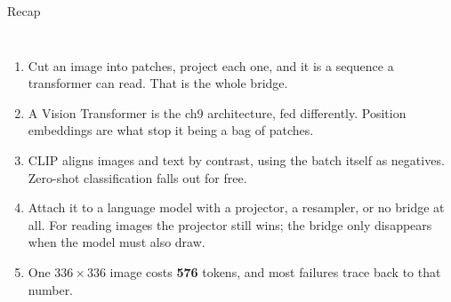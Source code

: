 \documentclass[aspectratio=169]{beamer}
\begin{document}
\begin{frame}{Recap}
  \small
  \begin{columns}[T]
    \begin{enumerate}\footnotesize\itemsep 3pt
      \item Cut an image into patches, project each one, and it is a sequence a transformer
        can read. That is the whole bridge.
      \item A Vision Transformer is the ch9 architecture, fed differently. Position
        embeddings are what stop it being a bag of patches.
      \item CLIP aligns images and text by contrast, using the batch itself as negatives.
        Zero-shot classification falls out for free.
      \item Attach it to a language model with a projector, a resampler, or no bridge at
        all. For reading images the projector still wins; the bridge only disappears when
        the model must also draw.
      \item One $336\times336$ image costs \textbf{576} tokens, and most failures trace back
        to that number.
    \end{enumerate}
    \vskip 12pt
  \end{columns}
\end{frame}
\end{document}
